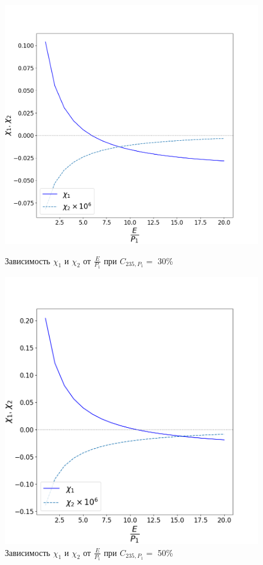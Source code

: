 \begin{figure}[ht]
\begin{minipage}{.5\textwidth}
    \label{delta2}
  \end{minipage}
  \begin{minipage}{.5\textwidth}
    \centering
    \includegraphics[width=.8\linewidth]{images/plots/Figure_30}  
    \caption{Зависимость $\chi_1$ и $\chi_2$ от $\frac{E}{P_1}$ при $C_{235, P_1}=$ 30\%}
    \label{delta3}
  \end{minipage}
  \begin{minipage}{.5\textwidth}
    \centering
    \includegraphics[width=.8\linewidth]{images/plots/Figure_50}  
    \caption{Зависимость $\chi_1$ и $\chi_2$ от $\frac{E}{P_1}$ при $C_{235, P_1}=$ 50\%}
    \label{delta4}
  \end{minipage}
 \end{figure}

